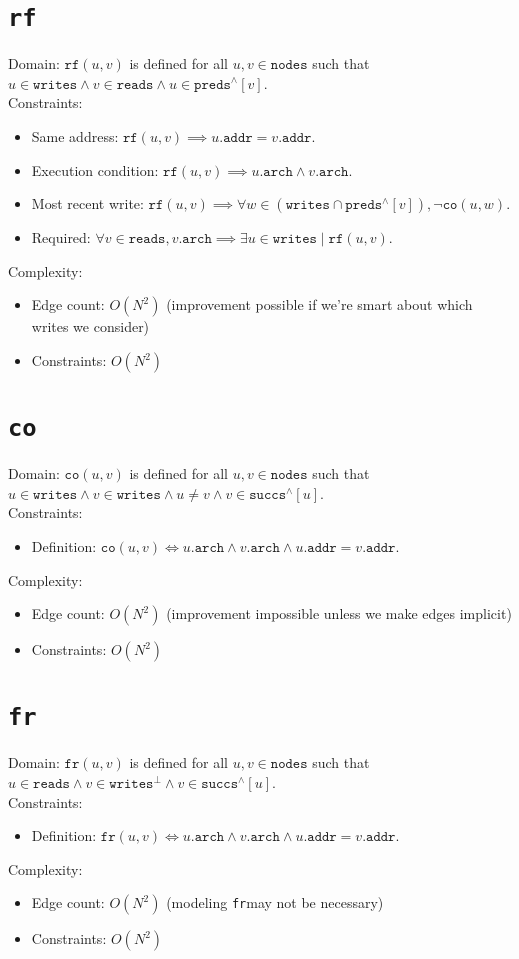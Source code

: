 \documentclass{article}
\newcommand{\preds}{\texttt{preds}}
\newcommand{\succs}{\texttt{succs}}
\newcommand{\nodes}{\texttt{nodes}}
\newcommand{\arch}{\texttt{arch}}
\newcommand{\addr}{\texttt{addr}}
\newcommand{\rf}{\texttt{rf}}
\newcommand{\co}{\texttt{co}}
\newcommand{\fr}{\texttt{fr}}
\newcommand{\closure}[1]{#1^\wedge}
\newcommand{\writes}{\texttt{writes}}
\newcommand{\reads}{\texttt{reads}}
\begin{document}
\section{\rf}
Domain: $\rf(u,v)$ is defined for all $u,v \in \nodes$ such that $u \in \writes \wedge v \in \reads \wedge u \in \closure{\preds}[v]$.
\\
Constraints:
\begin{itemize}
\item Same address: $\rf(u,v) \implies u.\addr = v.\addr$.
\item Execution condition: $\rf(u,v) \implies u.\arch \wedge v.\arch$.
\item Most recent write: $\rf(u,v) \implies
  \forall w \in \left( \writes \cap \closure{\preds}[v] \right), \neg \co(u,w)$.
\item Required: $\forall v \in \reads, v.\arch \implies \exists u \in \writes \mid \rf(u,v)$.
\end{itemize}
Complexity:
\begin{itemize}
\item Edge count: $O(N^2)$ (improvement possible if we're smart about which writes we consider)
\item Constraints: $O(N^2)$
\end{itemize}

\section{\co}
Domain: $\co(u,v)$ is defined for all $u,v \in \nodes$ such that $u \in \writes \wedge v \in \writes \wedge u \neq v \wedge v \in \closure{\succs}[u]$.
\\
Constraints:
\begin{itemize}
\item Definition: $\co(u,v) \iff u.\arch \wedge v.\arch \wedge u.\addr = v.\addr$.
\end{itemize}
Complexity:
\begin{itemize}
\item Edge count: $O(N^2)$ (improvement impossible unless we make edges implicit)
\item Constraints: $O(N^2)$
\end{itemize}


\section{\fr}
Domain: $\fr(u,v)$ is defined for all $u,v \in \nodes$ such that $u \in \reads \wedge v \in \writes^\bot \wedge v \in \closure{\succs}[u]$.
\\
Constraints:
\begin{itemize}
\item Definition: $\fr(u,v) \iff u.\arch \wedge v.\arch \wedge u.\addr = v.\addr$.
\end{itemize}
Complexity:
\begin{itemize}
\item Edge count: $O(N^2)$ (modeling \fr may not be necessary)
\item Constraints: $O(N^2)$
\end{itemize}
\end{document}
